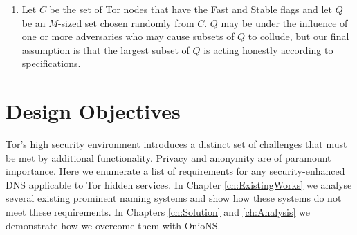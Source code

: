 \documentclass{sig-alternate}
\begin{document}
\begin{enumerate}
	\item Let $ C $ be the set of Tor nodes that have the Fast and Stable flags and let $ Q $ be an $ M $-sized set chosen randomly from $ C $. $ Q $ may be under the influence of one or more adversaries who may cause subsets of $ Q $ to collude, but our final assumption is that the largest subset of $ Q $ is acting honestly according to specifications.
\end{enumerate}

\section{Design Objectives}

Tor's high security environment introduces a distinct set of challenges that must be met by additional functionality. Privacy and anonymity are of paramount importance. Here we enumerate a list of requirements for any security-enhanced DNS applicable to Tor hidden services. In Chapter \ref{ch:ExistingWorks} we analyse several existing prominent naming systems and show how these systems do not meet these requirements. In Chapters \ref{ch:Solution} and \ref{ch:Analysis} we demonstrate how we overcome them with OnioNS.
\end{document}
